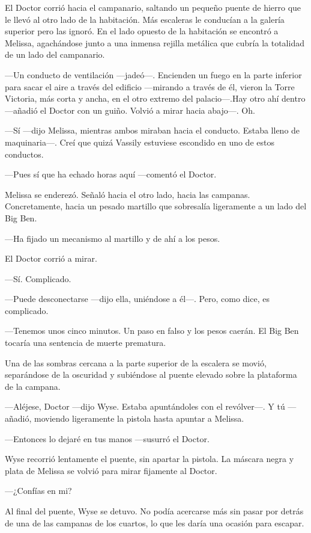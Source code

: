 {El Doctor corrió hacia el campanario, saltando un pequeño puente de
	hierro que le llevó al otro lado de la habitación. Más escaleras le
	conducían a la galería superior pero las ignoró. En el lado opuesto de
	la habitación se encontró a Melissa, agachándose junto a una inmensa
rejilla metálica que cubría la totalidad de un lado del campanario.}

{---Un conducto de ventilación ---jadeó---. Encienden un fuego en la
	parte inferior para sacar el aire a través del edificio ---mirando a
	través de él, vieron la Torre Victoria, más corta y ancha, en el otro
	extremo del palacio---.Hay otro ahí dentro ---añadió el Doctor con un
guiño. Volvió a mirar hacia abajo---. Oh.}

{---Sí ---dijo Melissa, mientras ambos miraban hacia el conducto. Estaba
	lleno de maquinaria---. Creí que quizá Vassily estuviese escondido en
uno de estos conductos.}

{---Pues sí que ha echado horas aquí ---comentó el Doctor.}

{Melissa se enderezó. Señaló hacia el otro lado, hacia las campanas.
	Concretamente, hacia un pesado martillo que sobresalía ligeramente a un
lado del Big Ben.}

{---Ha fijado un mecanismo al martillo y de ahí a los pesos.}

{El Doctor corrió a mirar.}

{---Sí. Complicado.}

{---Puede desconectarse ---dijo ella, uniéndose a él---. Pero, como
dice, es complicado.}

{---Tenemos unos cinco minutos. Un paso en falso y los pesos caerán. El
Big Ben tocaría una sentencia de muerte prematura.}

{Una de las sombras cercana a la parte superior de la escalera se movió,
	separándose de la oscuridad y subiéndose al puente elevado sobre la
plataforma de la campana.}

{---Aléjese, Doctor ---dijo Wyse. Estaba apuntándoles con el
	revólver---. Y tú ---añadió, moviendo ligeramente la pistola hasta
apuntar a Melissa.}

{---Entonces lo dejaré en tus manos ---susurró el Doctor.}

{Wyse recorrió lentamente el puente, sin apartar la pistola. La máscara
negra y plata de Melissa se volvió para mirar fijamente al Doctor.}

{---¿Confías en mi?}

{Al final del puente, Wyse se detuvo. No podía acercarse más sin pasar
	por detrás de una de las campanas de los cuartos, lo que les daría una
ocasión para escapar.}

